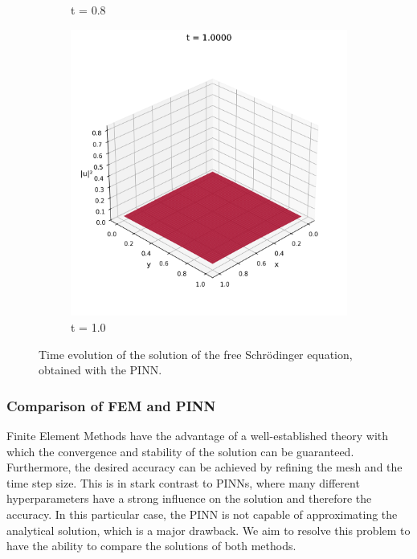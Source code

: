 \documentclass{article}
\theoremstyle{definition}
\theoremstyle{plain}
\theoremstyle{remark}
\begin{document}
\begin{figure}[h]
\begin{subfigure}[b]{0.3\textwidth}
    \caption{t = 0.8}
  \end{subfigure}
  \hfill
  \begin{subfigure}[b]{0.3\textwidth}
    \centering
    \includegraphics[width=\textwidth, trim=0cm 0cm 0cm 1cm, clip]{figures/pinn_frame_0050.png}
    \caption{t = 1.0}
  \end{subfigure}
  \caption{Time evolution of the solution of the free Schrödinger equation, obtained with the PINN.}
  \label{fig:free_solution_evolution_pinn}
\end{figure}

\subsubsection*{Comparison of FEM and PINN}

Finite Element Methods have the advantage of a well-established theory with which the convergence and stability of the solution can be guaranteed. Furthermore, the desired accuracy can be achieved by refining the mesh and the time step size. This is in stark contrast to PINNs, where many different hyperparameters have a strong influence on the solution and therefore the accuracy. In this particular case, the PINN is not capable of approximating the analytical solution, which is a major drawback. We aim to resolve this problem to have the ability to compare the solutions of both methods.
\end{document}
